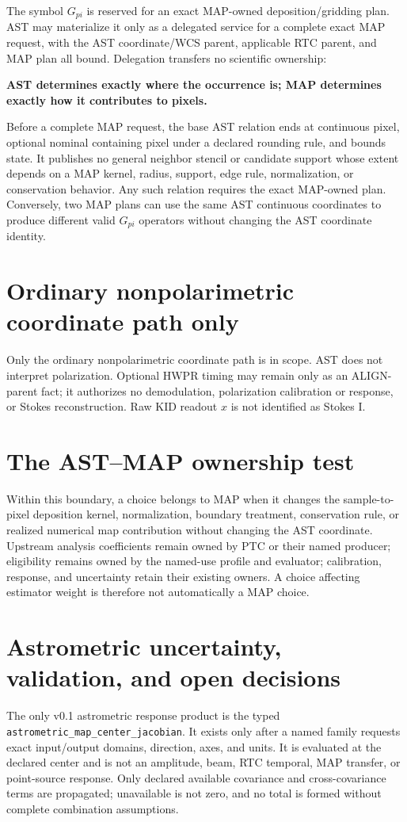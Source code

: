 \documentclass[10pt]{article}
\begin{document}
The symbol $G_{pi}$ is reserved for an exact MAP-owned deposition/gridding
plan. AST may materialize it only as a delegated service for a complete exact
MAP request, with the AST coordinate/WCS parent, applicable RTC parent, and
MAP plan all bound. Delegation transfers no scientific ownership:
\begin{center}
\textbf{AST determines exactly where the occurrence is; MAP determines
exactly how it contributes to pixels.}
\end{center}

Before a complete MAP request, the base AST relation ends at continuous pixel,
optional nominal containing pixel under a declared rounding rule, and bounds
state. It publishes no general neighbor stencil or candidate support whose
extent depends on a MAP kernel, radius, support, edge rule, normalization, or
conservation behavior. Any such relation requires the exact MAP-owned plan.
Conversely, two MAP plans can use the same AST continuous coordinates to
produce different valid $G_{pi}$ operators without changing the AST coordinate
identity.

\section*{Ordinary nonpolarimetric coordinate path only}
Only the ordinary nonpolarimetric coordinate path is in scope. AST does not
interpret polarization. Optional HWPR timing may remain only as an ALIGN-parent
fact; it authorizes no demodulation, polarization calibration or response, or
Stokes reconstruction. Raw KID readout $x$ is not identified as Stokes I.

\section*{The AST--MAP ownership test}
Within this boundary, a choice belongs to MAP when it changes the
sample-to-pixel deposition kernel, normalization, boundary treatment,
conservation rule, or realized numerical map contribution without changing
the AST coordinate. Upstream analysis coefficients remain owned by PTC or
their named producer; eligibility remains owned by the named-use profile and
evaluator; calibration, response, and uncertainty retain their existing
owners. A choice affecting estimator weight is therefore not automatically a
MAP choice.

\newpage
\section{Astrometric uncertainty, validation, and open decisions}
The only v0.1 astrometric response product is the typed
\texttt{astrometric\_map\_center\_jacobian}. It exists only after a named
family requests exact input/output domains, direction, axes, and units. It is
evaluated at the declared center and is not an amplitude, beam, RTC temporal,
MAP transfer, or point-source response. Only declared available covariance
and cross-covariance terms are propagated; unavailable is not zero, and no
total is formed without complete combination assumptions.
\end{document}
